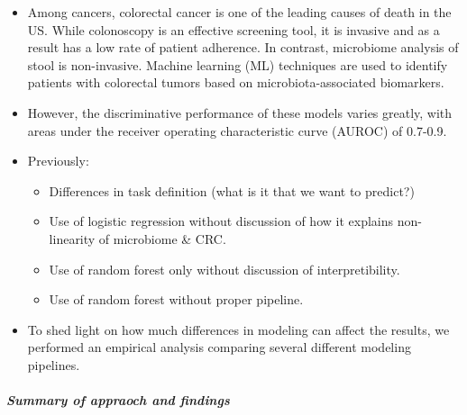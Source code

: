 \documentclass[11pt,]{article}
\providecommand{\tightlist}{%
  \setlength{\itemsep}{0pt}\setlength{\parskip}{0pt}}
\let\oldsubparagraph\subparagraph
\renewcommand{\subparagraph}[1]{\oldsubparagraph{#1}\mbox{}}
\begin{document}
\begin{itemize}
\item
  Among cancers, colorectal cancer is one of the leading causes of death
  in the US. While colonoscopy is an effective screening tool, it is
  invasive and as a result has a low rate of patient adherence. In
  contrast, microbiome analysis of stool is non-invasive. Machine
  learning (ML) techniques are used to identify patients with colorectal
  tumors based on microbiota-associated biomarkers.
\item
  However, the discriminative performance of these models varies
  greatly, with areas under the receiver operating characteristic curve
  (AUROC) of 0.7-0.9.
\item
  Previously:

  \begin{itemize}
  \tightlist
  \item
    Differences in task definition (what is it that we want to predict?)
  \item
    Use of logistic regression without discussion of how it explains
    non-linearity of microbiome \& CRC.
  \item
    Use of random forest only without discussion of interpretibility.
  \item
    Use of random forest without proper pipeline.
  \end{itemize}
\item
  To shed light on how much differences in modeling can affect the
  results, we performed an empirical analysis comparing several
  different modeling pipelines.
\end{itemize}

\subparagraph{Summary of appraoch and
findings}\label{summary-of-appraoch-and-findings}
\end{document}

